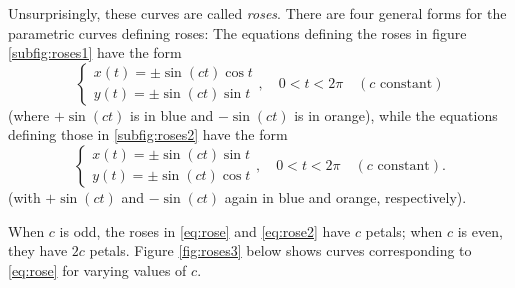 \documentclass[12pt]{article}
\begin{document}
	Unsurprisingly, these curves are called \textit{roses}. There are four general forms for the parametric curves defining roses: The equations defining the roses in figure \eqref{subfig:roses1} have the form
	\begin{equation}
		\label{eq:rose}
		\left\{
		\begin{array}{l}
		x(t)=\pm\sin(ct)\cos{t}\\
		y(t)=\pm\sin(ct)\sin{t}
		\end{array}
	\right.,\quad 0 < t < 2\pi\quad(c\text{ constant})\end{equation}
	(where $+\sin(ct)$ is in blue and $-\sin(ct)$ is in orange), while the equations defining those in \eqref{subfig:roses2} have the form
	\begin{equation}
		\label{eq:rose2}
		\left\{
		\begin{array}{l}
		x(t)=\pm\sin(ct)\sin{t}\\
		y(t)=\pm\sin(ct)\cos{t}
		\end{array}
	\right.,\quad 0 < t < 2\pi\quad(c\text{ constant}).\end{equation}
	(with $+\sin(ct)$ and $-\sin(ct)$ again in blue and orange, respectively).
	
	When $c$ is odd, the roses in \eqref{eq:rose} and \eqref{eq:rose2} have $c$ petals; when $c$ is even, they have $2c$ petals. Figure \ref{fig:roses3} below shows curves corresponding to \eqref{eq:rose} for varying values of $c$.
	
\end{document}

